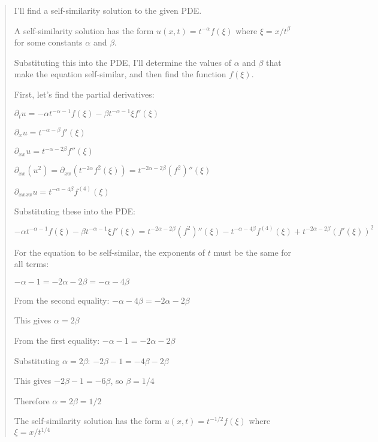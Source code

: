 \documentclass{article}
\begin{document}
\begin{quote}
I'll find a self-similarity solution to the given PDE.



A self-similarity solution has the form $u(x,t) = t^{-\alpha} f(\xi)$ where $\xi = x/t^\beta$ for some constants $\alpha$ and $\beta$.



Substituting this into the PDE, I'll determine the values of $\alpha$ and $\beta$ that make the equation self-similar, and then find the function $f(\xi)$.



First, let's find the partial derivatives:

$\partial_t u = -\alpha t^{-\alpha-1} f(\xi) - \beta t^{-\alpha-1} \xi f'(\xi)$

$\partial_x u = t^{-\alpha-\beta} f'(\xi)$

$\partial_{xx} u = t^{-\alpha-2\beta} f''(\xi)$

$\partial_{xx}(u^2) = \partial_{xx}(t^{-2\alpha} f^2(\xi)) = t^{-2\alpha-2\beta} (f^2)''(\xi)$

$\partial_{xxxx} u = t^{-\alpha-4\beta} f^{(4)}(\xi)$



Substituting these into the PDE:

$-\alpha t^{-\alpha-1} f(\xi) - \beta t^{-\alpha-1} \xi f'(\xi) = t^{-2\alpha-2\beta} (f^2)''(\xi) - t^{-\alpha-4\beta} f^{(4)}(\xi) + t^{-2\alpha-2\beta} (f'(\xi))^2$



For the equation to be self-similar, the exponents of $t$ must be the same for all terms:

$-\alpha-1 = -2\alpha-2\beta = -\alpha-4\beta$



From the second equality: $-\alpha-4\beta = -2\alpha-2\beta$

This gives $\alpha = 2\beta$



From the first equality: $-\alpha-1 = -2\alpha-2\beta$

Substituting $\alpha = 2\beta$: $-2\beta-1 = -4\beta-2\beta$

This gives $-2\beta-1 = -6\beta$, so $\beta = 1/4$



Therefore $\alpha = 2\beta = 1/2$



The self-similarity solution has the form $u(x,t) = t^{-1/2} f(\xi)$ where $\xi = x/t^{1/4}$




\end{quote}
\end{document}
